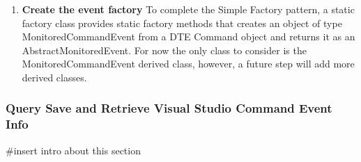 \begin{enumerate}
 The constructor that takes a Command as input, simply extracts the necessary and relevant fields from the DTE's Command object and transferrs the matching information into the corresponding fields from this class and the AbstractMonitoredEvent class.  


\begin{lstlisting}
    [XmlRoot(ElementName = "MonitoredEvent", Namespace = "http://Monitor")]
    public class MonitoredCommandEvent : AbstractMonitoredEvent {

         public int EventID { get; set; }
        public String Guid { get; set; }

        public MonitoredCommandEvent()
        {
        }

        public MonitoredCommandEvent(Command DTECommandObj) {
            if (DTECommandObj != null) {
                this.EventName = DTECommandObj.Name;
                this.Classification = EventName.Split('.')[0];  //use the first part of event name
                this.Guid = DTECommandObj.Guid;
                this.EventID = DTECommandObj.ID;
            }
            else {
                throw new ArgumentNullException("DTECommandObj");
            }
        }
\end{lstlisting}

 The attribute for XMLRoot is the same attribute assigned to the AbstractMonitoredEvent class which tells XML Serialization that this type is a type beloging to the abstract class.  In this class, create two public fields, EventID as int and GUID as string, that will save important information from the Visual Studio DTE object needed to engage monitoring for each command.  

\item {\bf Create the event factory}
To complete the Simple Factory pattern, a static factory class provides static factory methods that creates an object of type  MonitoredCommandEvent from a DTE Command object and returns it as an AbstractMonitoredEvent.  For now the only class to consider is the MonitoredCommandEvent derived class, however, a future step will add more derived classes.  
\end{enumerate}

\subsubsection{Query Save and Retrieve Visual Studio Command Event Info}

#insert intro about this section

